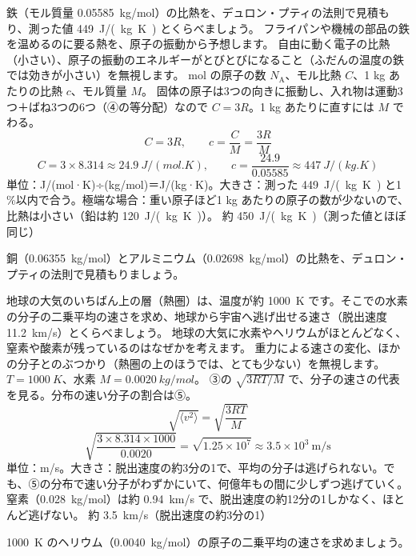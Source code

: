 \begin{phreidai}
\label{ph:熱-14:ex4}鉄（モル質量 \qty{0.05585}{kg/mol}）の比熱を、デュロン・プティの法則で見積もり、測った値 \qty{449}{J/(kg.K)} とくらべましょう。
\phbamen
フライパンや機械の部品の鉄を温めるのに要る熱を、原子の振動から予想します。
\phmushi
自由に動く電子の比熱（小さい）、原子の振動のエネルギーがとびとびになること（ふだんの温度の鉄では効きが小さい）を無視します。
 mol の原子の数 $N_{\mathrm A}$、モル比熱 $C$、1 kg あたりの比熱 $c$、モル質量 $M$。
\phriyu
固体の原子は3つの向きに振動し、入れ物は運動3つ＋ばね3つの6つ（④の等分配）なので $C=3R$。1 kg あたりに直すには $M$ でわる。
\phtateru
\[ C=3R,\qquad c=\frac{C}{M}=\frac{3R}{M} \]
\phtoku
\[ C=3\times8.314\approx\qty{24.9}{J/(mol.K)},\qquad c=\frac{24.9}{0.05585}\approx\qty{447}{J/(kg.K)} \]
\phtashikame
単位：J/(mol·K)÷(kg/mol)＝J/(kg·K)。大きさ：測った \qty{449}{J/(kg.K)} と1\,\%以内で合う。極端な場合：重い原子ほど1 kg あたりの原子の数が少ないので、比熱は小さい（鉛は約 \qty{120}{J/(kg.K)}）。
\kotae 約 \qty{450}{J/(kg.K)}（測った値とほぼ同じ）
\end{phreidai}
\begin{jibun}
銅（\qty{0.06355}{kg/mol}）とアルミニウム（\qty{0.02698}{kg/mol}）の比熱を、デュロン・プティの法則で見積もりましょう。
\end{jibun}

\begin{phreidai}
\label{ph:熱-14:ex5}地球の大気のいちばん上の層（熱圏）は、温度が約 \qty{1000}{K} です。そこでの水素の分子の二乗平均の速さを求め、地球から宇宙へ逃げ出せる速さ（脱出速度 \qty{11.2}{km/s}）とくらべましょう。
\phbamen
地球の大気に水素やヘリウムがほとんどなく、窒素や酸素が残っているのはなぜかを考えます。
\phmushi
重力による速さの変化、ほかの分子とのぶつかり（熱圏の上のほうでは、とても少ない）を無視します。
\phzu
$T=\qty{1000}{K}$、水素 $M=\qty{0.0020}{kg/mol}$。
\phriyu
③の $\sqrt{3RT/M}$ で、分子の速さの代表を見る。分布の速い分子の割合は⑤。
\phtateru
\[ \sqrt{\langle v^2\rangle}=\sqrt{\frac{3RT}{M}} \]
\phtoku
\[ \sqrt{\frac{3\times8.314\times1000}{0.0020}}=\sqrt{1.25\times10^7}\approx3.5\times10^3\ \mathrm{m/s} \]
\phtashikame
単位：m/s。大きさ：脱出速度の約3分の1で、平均の分子は逃げられない。でも、⑤の分布で速い分子がわずかにいて、何億年もの間に少しずつ逃げていく。窒素（\qty{0.028}{kg/mol}）は約 \qty{0.94}{km/s} で、脱出速度の約12分の1しかなく、ほとんど逃げない。
\kotae 約 \qty{3.5}{km/s}（脱出速度の約3分の1）
\end{phreidai}
\begin{jibun}
\qty{1000}{K} のヘリウム（\qty{0.0040}{kg/mol}）の原子の二乗平均の速さを求めましょう。
\end{jibun}

